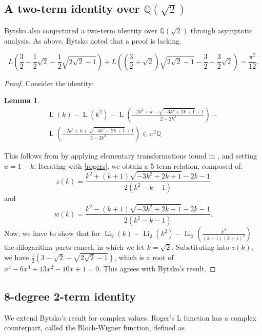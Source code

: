 \documentclass[12pt]{article}
\newtheorem{lemma}{Lemma}%
\begin{document}
\subsection{A two-term identity over $\mathbb{Q}(\sqrt{2})$}
 Bytsko \cite{Bytsko1999} also conjectured a two-term identity over $\mathbb{Q}(\sqrt{2})$ through asymptotic analysis. As 
 above, Bytsko noted that a proof is lacking. 

 \[
L\!\left(\frac{3}{2} - \frac{1}{2}\sqrt{2} - \frac{1}{2}\sqrt{2\sqrt{2}-1}\right)
+
L\!\left(\left(\frac{3}{2} + \sqrt{2}\right)\sqrt{2\sqrt{2}-1} - \frac{3}{2} - \frac{3}{2}\sqrt{2}\right)
=
\frac{\pi^2}{12}.
\]

\begin{proof}
    
 Consider the identity:
\begin{lemma}\label{previously10p2}
 \begin{multline}
 \operatorname{L}(k) - \operatorname{L}(k^2) 
 - \operatorname{L}\left(\frac{-2k^2 + k - \sqrt{-3k^2 + 2k + 1} + 1}{2 - 2k^2}\right) - \\ 
 \operatorname{L}\left(\frac{-2k^2 + k + \sqrt{-3k^2 + 2k + 1} + 1}{2 - 2k^2}\right)  \in \pi^2 \mathbb{Q}
\end{multline}
\end{lemma}

\noindent This follows from  by applying elementary  transformations found in , and setting $u = 1 - k$. Iterating with \eqref{rogers}, we obtain a 5-term relation, composed of: $$ z(k) = \frac{k^2 + (k + 1) \sqrt{-3k^2 + 2k + 1} - 
 2k - 1}{2(k^2 - k - 1)} $$ and $$ w(k) = \frac{k^2 - (k + 1) \sqrt{-3k^2 + 2k + 1} - 2k - 1}{2(k^2 - k - 1)}. $$ Now, we have to 
 show that for $\operatorname{Li}_2(k) - \operatorname{Li}_2(k^2) - \operatorname{Li}_2\left( \frac{k^3}{(k - 1)(k + 1)^2} \right)$ the 
 dilogarithm parts cancel, in which we let $k=\sqrt{2}$. Substituting into $z(k)$, we have $\frac{1}{2} \left( 3 - \sqrt{2} - \sqrt{2\sqrt{2} - 
 1} \right) $, which is a root of $x^4 - 6 x^3 + 13 x^2 - 10 x + 1=0$. This agrees with Bytsko's result.

\end{proof}

\subsection{8-degree 2-term identity}


We extend Bytsko's result for complex values. Roger's L function has a complex counterpart, called the Bloch-Wigner function, defined as 
\end{document}
